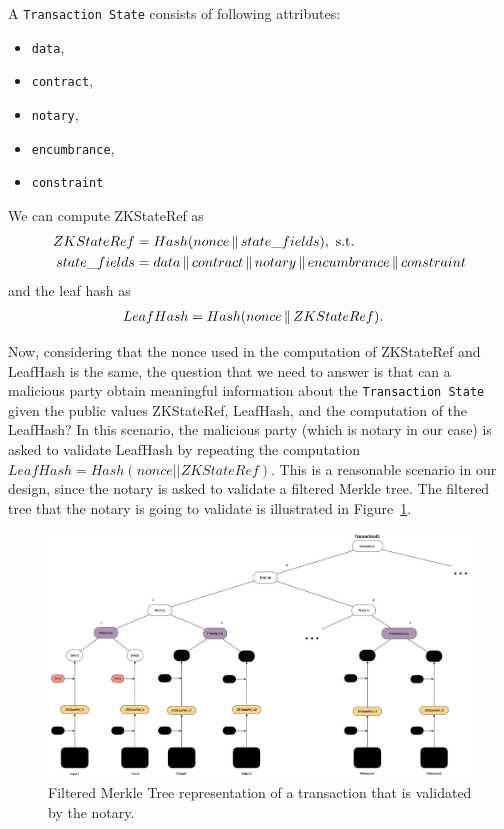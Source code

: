 A \texttt{Transaction State} consists of following attributes: 
\begin{itemize}
\item \texttt{data},
\item \texttt{contract},
\item \texttt{notary},
\item \texttt{encumbrance},
\item \texttt{constraint}
\end{itemize}

We can compute ZKStateRef as 
\begin{align}
ZKStateRef &= Hash(nonce \operatorname{\mathbin\Vert} state\_fields), \text{ s.t.} \\
state\_fields &= data \operatorname{\mathbin\Vert} contract \operatorname{\mathbin\Vert} notary \operatorname{\mathbin\Vert} encumbrance \operatorname{\mathbin\Vert} constraint \nonumber
\end{align} 
\noindent and the leaf hash as 
\begin{align}
LeafHash &= Hash(nonce \operatorname{\mathbin\Vert} ZKStateRef).
\end{align}

Now, considering that the nonce used in the computation of ZKStateRef and LeafHash is the same, the question that we need to answer is that can a malicious party obtain meaningful information about the \texttt{Transaction State} given the public values ZKStateRef, LeafHash, and the computation of the LeafHash?
In this scenario, the malicious party (which is notary in our case) is asked to validate LeafHash by repeating the computation $LeafHash = Hash(nonce || ZKStateRef)$.
This is a reasonable scenario in our design, since the notary is asked to validate a filtered Merkle tree.
The filtered tree that the notary is going to validate is illustrated in Figure~\ref{fig:filtered_tree_ts}.

\begin{figure}[ht]
\includegraphics[width=\textwidth]{Appendix1/images/filtered_tree_ts}
\caption{Filtered Merkle Tree representation of a transaction that is validated by the notary.}
\label{fig:filtered_tree_ts}
\end{figure}

